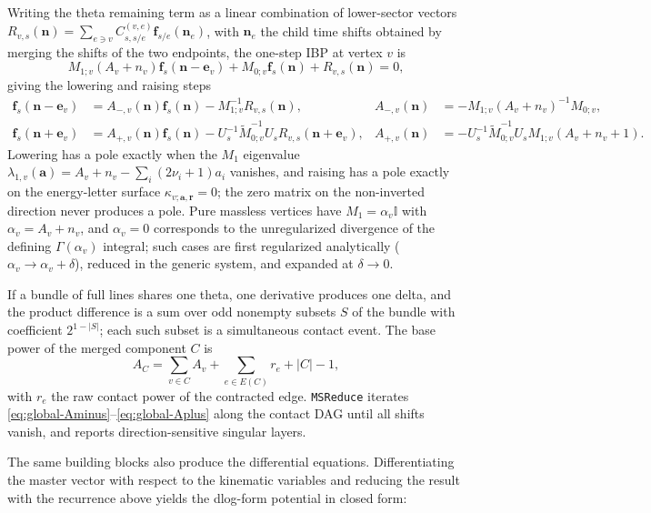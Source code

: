 \documentclass[11pt,a4paper]{article}
\newcommand{\Id}{\mathbb I}
\begin{document}
Writing the theta remaining term as a linear combination of lower-sector vectors
$R_{v,s}(\bm n)=\sum_{e\ni v}C_{s,s/e}^{(v,e)}\bm f_{s/e}(\bm n_e)$, with $\bm n_e$ the child time
shifts obtained by merging the shifts of the two endpoints, the one-step IBP at vertex $v$ is
\begin{equation}
  M_{1;v}(A_v+n_v)\bm f_s(\bm n-\bm e_v)
  +M_{0;v}\bm f_s(\bm n)
  +R_{v,s}(\bm n)=0,
  \label{eq:global-one-step-ibp}
\end{equation}
giving the lowering and raising steps
\begin{align}
  \bm f_s(\bm n-\bm e_v)
  &=A_{-,v}(\bm n)\bm f_s(\bm n)
  -M_{1;v}^{-1}R_{v,s}(\bm n),
  &A_{-,v}(\bm n)&=-M_{1;v}(A_v+n_v)^{-1}M_{0;v},
  \label{eq:global-Aminus}\\
  \bm f_s(\bm n+\bm e_v)
  &=A_{+,v}(\bm n)\bm f_s(\bm n)
  -U_s^{-1}\widetilde M_{0;v}^{-1}U_s
  R_{v,s}(\bm n+\bm e_v),
  &A_{+,v}(\bm n)&=-U_s^{-1}\widetilde M_{0;v}^{-1}U_s
  M_{1;v}(A_v+n_v+1).
  \label{eq:global-Aplus}
\end{align}
Lowering has a pole exactly when the $M_1$ eigenvalue
$\lambda_{1,v}(\bm a)=A_v+n_v-\sum_i(2\nu_i+1)a_i$ vanishes, and raising has a pole exactly on the
energy-letter surface $\kappa_{v;\bm a,\bm r}=0$; the zero matrix on the non-inverted direction
never produces a pole. Pure massless vertices have $M_1=\alpha_v\Id$ with
$\alpha_v=A_v+n_v$, and $\alpha_v=0$ corresponds to the unregularized divergence of the defining
$\Gamma(\alpha_v)$ integral; such cases are first regularized analytically
($\alpha_v\to\alpha_v+\delta$), reduced in the generic system, and expanded at $\delta\to0$.

If a bundle of full lines shares one theta, one derivative produces one delta, and the product
difference is a sum over odd nonempty subsets $S$ of the bundle with coefficient $2^{1-|S|}$; each
such subset is a simultaneous contact event. The base power of the merged component $C$ is
\begin{equation}
  A_C=\sum_{v\in C}A_v+\sum_{e\in E(C)}r_e+|C|-1,
  \label{eq:simultaneous-contact-base-power}
\end{equation}
with $r_e$ the raw contact power of the contracted edge. \texttt{MSReduce} iterates
\eqref{eq:global-Aminus}--\eqref{eq:global-Aplus} along the contact DAG until all shifts vanish,
and reports direction-sensitive singular layers.

The same building blocks also produce the differential equations. Differentiating the master
vector with respect to the kinematic variables and reducing the result with the recurrence above
yields the dlog-form potential in closed form:
\end{document}
